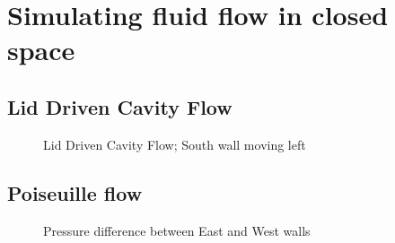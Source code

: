 \documentclass[a4paper]{report}
\begin{document}
\section{Simulating fluid flow in closed space}

\subsection*{Lid Driven Cavity Flow}

\begin{figure}[!htbp]
\centering
{}
\hspace{.25in}
\centering
\caption{Lid Driven Cavity Flow; South wall moving left}
\end{figure}
\subsection*{Poiseuille flow}

\begin{figure}[!htbp]
\centering
{}
\hspace{.25in}
\hspace{.25in}
\centering
\caption{Pressure difference between East and West walls}
\end{figure}
\end{document}
